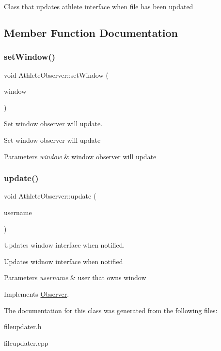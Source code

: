 Class that updates athlete interface when file has been updated 

\subsection{Member Function Documentation}
\mbox{\label{classAthleteObserver_a585790e9f305e3602fe42481f8dc7b5d}} 
\subsubsection{\texorpdfstring{setWindow()}{setWindow()}}
{\footnotesize\ttfamily void Athlete\+Observer\+::set\+Window (\begin{DoxyParamCaption}\item[{\mbox{\hyperlink{classAthlWindow}{Athl\+Window}} $\ast$}]{window }\end{DoxyParamCaption})}



Set window observer will update. 

Set window observer will update 
\begin{DoxyParams}{Parameters}
{\em window} & window observer will update \\
\hline
\end{DoxyParams}
\mbox{\label{classAthleteObserver_adc653afe856672101bd935874967485e}} 
\subsubsection{\texorpdfstring{update()}{update()}}
{\footnotesize\ttfamily void Athlete\+Observer\+::update (\begin{DoxyParamCaption}\item[{std\+::string}]{username }\end{DoxyParamCaption})\hspace{0.3cm}{\ttfamily [virtual]}}



Updates window interface when notified. 

Updates widnow interface when notified 
\begin{DoxyParams}{Parameters}
{\em username} & user that owns window \\
\hline
\end{DoxyParams}


Implements \mbox{\hyperlink{classObserver_a8de6a6c3270b66dfe4cf5a172705a4b1}{Observer}}.



The documentation for this class was generated from the following files\+:\begin{DoxyCompactItemize}
\item 
fileupdater.\+h\item 
fileupdater.\+cpp\end{DoxyCompactItemize}
